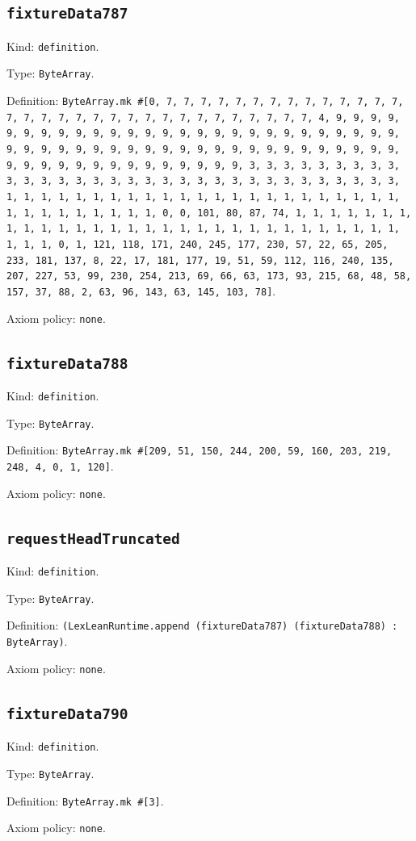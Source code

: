 \documentclass[11pt]{article}
\begin{document}
\subsection*{\texttt{fixtureData787}}
\noindent Kind: \texttt{definition}.\par
\noindent Type: \texttt{ByteArray}.\par
\noindent Definition: \texttt{ByteArray.mk \#[0, 7, 7, 7, 7, 7, 7, 7, 7, 7, 7, 7, 7, 7, 7, 7, 7, 7, 7, 7, 7, 7, 7, 7, 7, 7, 7, 7, 7, 7, 7, 7, 7, 4, 9, 9, 9, 9, 9, 9, 9, 9, 9, 9, 9, 9, 9, 9, 9, 9, 9, 9, 9, 9, 9, 9, 9, 9, 9, 9, 9, 9, 9, 9, 9, 9, 9, 9, 9, 9, 9, 9, 9, 9, 9, 9, 9, 9, 9, 9, 9, 9, 9, 9, 9, 9, 9, 9, 9, 9, 9, 9, 9, 9, 9, 9, 9, 9, 3, 3, 3, 3, 3, 3, 3, 3, 3, 3, 3, 3, 3, 3, 3, 3, 3, 3, 3, 3, 3, 3, 3, 3, 3, 3, 3, 3, 3, 3, 3, 3, 1, 1, 1, 1, 1, 1, 1, 1, 1, 1, 1, 1, 1, 1, 1, 1, 1, 1, 1, 1, 1, 1, 1, 1, 1, 1, 1, 1, 1, 1, 1, 1, 0, 0, 101, 80, 87, 74, 1, 1, 1, 1, 1, 1, 1, 1, 1, 1, 1, 1, 1, 1, 1, 1, 1, 1, 1, 1, 1, 1, 1, 1, 1, 1, 1, 1, 1, 1, 1, 1, 1, 0, 1, 121, 118, 171, 240, 245, 177, 230, 57, 22, 65, 205, 233, 181, 137, 8, 22, 17, 181, 177, 19, 51, 59, 112, 116, 240, 135, 207, 227, 53, 99, 230, 254, 213, 69, 66, 63, 173, 93, 215, 68, 48, 58, 157, 37, 88, 2, 63, 96, 143, 63, 145, 103, 78]}.\par
\noindent Axiom policy: \texttt{none}.\par
\subsection*{\texttt{fixtureData788}}
\noindent Kind: \texttt{definition}.\par
\noindent Type: \texttt{ByteArray}.\par
\noindent Definition: \texttt{ByteArray.mk \#[209, 51, 150, 244, 200, 59, 160, 203, 219, 248, 4, 0, 1, 120]}.\par
\noindent Axiom policy: \texttt{none}.\par
\subsection*{\texttt{requestHeadTruncated}}
\noindent Kind: \texttt{definition}.\par
\noindent Type: \texttt{ByteArray}.\par
\noindent Definition: \texttt{(LexLeanRuntime.append (fixtureData787) (fixtureData788) : ByteArray)}.\par
\noindent Axiom policy: \texttt{none}.\par
\subsection*{\texttt{fixtureData790}}
\noindent Kind: \texttt{definition}.\par
\noindent Type: \texttt{ByteArray}.\par
\noindent Definition: \texttt{ByteArray.mk \#[3]}.\par
\noindent Axiom policy: \texttt{none}.\par
\end{document}

